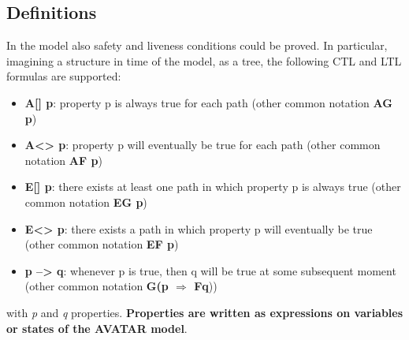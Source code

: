 \documentclass[12pt]{article}
\begin{document}
\subsection{Definitions}
In the model also safety and liveness conditions could be proved. In particular, imagining a structure in time of the model, as a tree, the following CTL and LTL formulas are supported:
\begin{itemize}
	\item \textbf{A[] p}: property p is always true for each path (other common notation \textbf{AG p})
	\item \textbf{A<> p}: property p will eventually be true for each path (other common notation \textbf{AF p})
	\item \textbf{E[] p}: there exists at least one path in which property p is always true (other common notation \textbf{EG p})
	\item \textbf{E<> p}:  there exists a path in which property p will eventually be true (other common notation \textbf{EF p})
	\item \textbf{p --> q}: whenever p is true, then q will be true at some subsequent moment (other common notation \textbf{G(p $\Rightarrow$ Fq}))
\end{itemize}
with \textit{p} and \textit{q} properties. \textbf{Properties are written as expressions on variables or states of the AVATAR model}.
\end{document}
